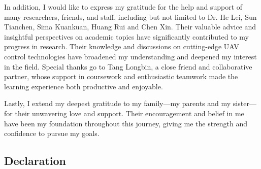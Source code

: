 \documentclass[12pt,twoside,letterpaper]{article}
\begin{document}
In addition, I would like to express my gratitude for the help and support of many researchers, friends, and staff, including but not limited to Dr. He Lei, Sun Tianchen, Sima Kuankuan, Huang Rui and Chen Xin. Their valuable advice and insightful perspectives on academic topics have significantly contributed to my progress in research. Their knowledge and discussions on cutting-edge UAV control technologies have broadened my understanding and deepened my interest in the field. Special thanks go to Tang Longbin, a close friend and collaborative partner, whose support in coursework and enthusiastic teamwork made the learning experience both productive and enjoyable. 

Lastly, I extend my deepest gratitude to my family—my parents and my sister—for their unwavering love and support. Their encouragement and belief in me have been my foundation throughout this journey, giving me the strength and confidence to pursue my goals.

\newpage


\begin{center}
    \section*{Declaration}
\end{center}

\vspace{2cm}
\end{document}
